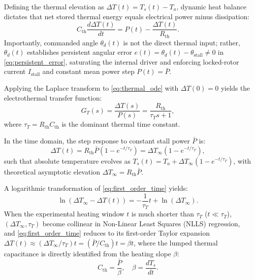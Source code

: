 \documentclass[lettersize,journal]{IEEEtran}
\begin{document}
	Defining the thermal elevation as $\Delta T(t) = T_s(t) - T_a$, dynamic heat balance dictates that net stored thermal energy equals electrical power minus dissipation:
	\begin{equation}
		C_{\text{th}}\frac{d\Delta T(t)}{dt} = P(t) - \frac{\Delta T(t)}{R_{\text{th}}}.
		\label{eq:thermal_ode}
	\end{equation}
	Importantly, commanded angle $\theta_d(t)$ is not the direct thermal input; rather, $\theta_d(t)$ establishes persistent angular error $e(t) = \theta_d(t) - \theta_{\text{stall}} \neq 0$ in \eqref{eq:persistent_error}, saturating the internal driver and enforcing locked-rotor current $I_{\text{stall}}$ and constant mean power step $P(t) = \bar{P}$.
	
	Applying the Laplace transform to \eqref{eq:thermal_ode} with $\Delta T(0) = 0$ yields the electrothermal transfer function:
	\begin{equation}
		G_T(s) = \frac{\Delta T(s)}{P(s)} = \frac{R_{\text{th}}}{\tau_T s + 1},
		\label{eq:transfer_function}
	\end{equation}
	where $\tau_T = R_{\text{th}}C_{\text{th}}$ is the dominant thermal time constant.
	
	In the time domain, the step response to constant stall power $\bar{P}$ is:
	\begin{equation}
		\Delta T(t) = R_{\text{th}}\bar{P}\left(1 - e^{-t/\tau_T}\right) = \Delta T_\infty\left(1 - e^{-t/\tau_T}\right),
		\label{eq:first_order_time}
	\end{equation}
	such that absolute temperature evolves as $T_s(t) = T_a + \Delta T_\infty(1 - e^{-t/\tau_T})$, with theoretical asymptotic elevation $\Delta T_\infty = R_{\text{th}}\bar{P}$.
	
	A logarithmic transformation of \eqref{eq:first_order_time} yields:
	\begin{equation}
		\ln\left(\Delta T_\infty - \Delta T(t)\right) = -\frac{1}{\tau_T}t + \ln(\Delta T_\infty).
		\label{eq:linearized_thermal}
	\end{equation}
	When the experimental heating window $t$ is much shorter than $\tau_T$ ($t \ll \tau_T$), $(\Delta T_\infty, \tau_T)$ become collinear in Non-Linear Least Squares (NLLS) regression, and \eqref{eq:first_order_time} reduces to its first-order Taylor expansion $\Delta T(t) \approx (\Delta T_\infty / \tau_T)t = (\bar{P} / C_{\text{th}})t = \beta t$, where the lumped thermal capacitance is directly identified from the heating slope $\beta$:
	\begin{equation}
		C_{\text{th}} = \frac{\bar{P}}{\beta}, \quad \beta = \frac{dT_s}{dt}.
		\label{eq:thermal_parameters}
	\end{equation}
	
\end{document}
